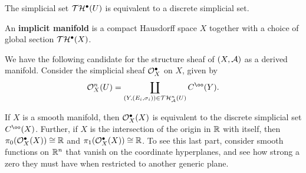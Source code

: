 \begin{prop}\label{thickenings-are-discrete}
The simplicial set $\mathcal T \mathcal H^\bullet(U)$ is equivalent to a discrete simplicial set.
\end{prop}

\begin{definition}\label{implicit-manifold}
An {\bf implicit manifold} is a compact Hausdorff space $X$ together with a choice of global section $\mathcal T \mathcal H^\bullet(X)$. 
\end{definition}

We have the following candidate for the structure sheaf of $(X, \mathcal A)$ as a derived manifold. Consider the simplicial sheaf $\mathcal O_X^\bullet$ on $X$, given by
\[ \cO_X^n(U) = \coprod_{(Y, (E_i, \sigma_i)) \in \cT \cH_\cA^n(U)} C^\oo(Y). \]


\begin{speculation}
If $X$ is a smooth manifold, then $\mathcal O_X^\bullet(X)$ is equivalent to the discrete simplicial set $C^\oo(X)$. Further, if $X$ is the intersection of the origin in $\mathbb R$ with itself, then $\pi_0(\mathcal O_X^\bullet(X)) \cong \mathbb R$ and $\pi_1(\mathcal O_X^\bullet(X)) \cong \mathbb R$. To see this last part, consider smooth functions on $\mathbb R^n$ that vanish on the coordinate hyperplanes, and see how strong a zero they must have when restricted to another generic plane.
\end{speculation}
